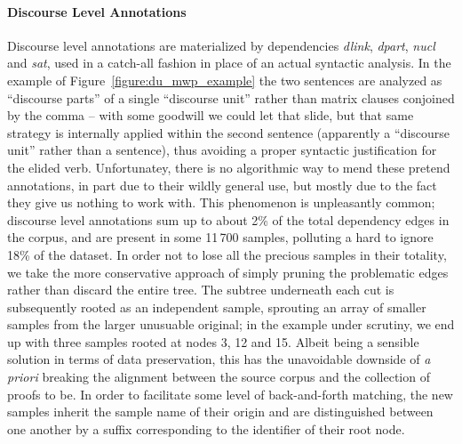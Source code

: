 \paragraph{Discourse Level Annotations}
Discourse level annotations are materialized by dependencies \textit{dlink}, \textit{dpart}, \textit{nucl} and \textit{sat}, used in a catch-all fashion in place of an actual syntactic analysis.
In the example of Figure~\ref{figure:du_mwp_example} the two sentences are analyzed as ``discourse parts'' of a single ``discourse unit'' rather than matrix clauses conjoined by the comma -- with some goodwill we could let that slide, but that same strategy is internally applied within the second sentence (apparently a ``discourse unit'' rather than a sentence), thus avoiding a proper syntactic justification for the elided verb. 
Unfortunatey, there is no algorithmic way to mend these pretend annotations, in part due to their wildly general use, but mostly due to the fact they give us nothing to work with.
This phenomenon is unpleasantly common; discourse level annotations sum up to about 2\% of the total dependency edges in the corpus, and are present in some 11\,700 samples, polluting a hard to ignore 18\% of the dataset.
In order not to lose all the precious samples in their totality, we take the more conservative approach of simply pruning the problematic edges rather than discard the entire tree.
The subtree underneath each cut is subsequently rooted as an independent sample, sprouting an array of smaller samples from the larger unusuable original; in the example under scrutiny, we end up with three samples rooted at nodes 3, 12 and 15.
Albeit being a sensible solution in terms of data preservation, this has the unavoidable downside of \textit{a priori} breaking the alignment between the source corpus and the collection of proofs to be.
In order to facilitate some level of back-and-forth matching, the new samples inherit the sample name of their origin and are distinguished between one another by a suffix corresponding to the identifier of their root node.

